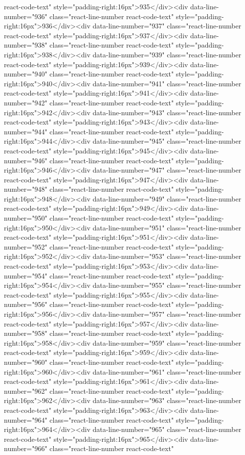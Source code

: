 react-code-text" style="padding-right:16px">935</div><div data-line-number="936" class="react-line-number react-code-text" style="padding-right:16px">936</div><div data-line-number="937" class="react-line-number react-code-text" style="padding-right:16px">937</div><div data-line-number="938" class="react-line-number react-code-text" style="padding-right:16px">938</div><div data-line-number="939" class="react-line-number react-code-text" style="padding-right:16px">939</div><div data-line-number="940" class="react-line-number react-code-text" style="padding-right:16px">940</div><div data-line-number="941" class="react-line-number react-code-text" style="padding-right:16px">941</div><div data-line-number="942" class="react-line-number react-code-text" style="padding-right:16px">942</div><div data-line-number="943" class="react-line-number react-code-text" style="padding-right:16px">943</div><div data-line-number="944" class="react-line-number react-code-text" style="padding-right:16px">944</div><div data-line-number="945" class="react-line-number react-code-text" style="padding-right:16px">945</div><div data-line-number="946" class="react-line-number react-code-text" style="padding-right:16px">946</div><div data-line-number="947" class="react-line-number react-code-text" style="padding-right:16px">947</div><div data-line-number="948" class="react-line-number react-code-text" style="padding-right:16px">948</div><div data-line-number="949" class="react-line-number react-code-text" style="padding-right:16px">949</div><div data-line-number="950" class="react-line-number react-code-text" style="padding-right:16px">950</div><div data-line-number="951" class="react-line-number react-code-text" style="padding-right:16px">951</div><div data-line-number="952" class="react-line-number react-code-text" style="padding-right:16px">952</div><div data-line-number="953" class="react-line-number react-code-text" style="padding-right:16px">953</div><div data-line-number="954" class="react-line-number react-code-text" style="padding-right:16px">954</div><div data-line-number="955" class="react-line-number react-code-text" style="padding-right:16px">955</div><div data-line-number="956" class="react-line-number react-code-text" style="padding-right:16px">956</div><div data-line-number="957" class="react-line-number react-code-text" style="padding-right:16px">957</div><div data-line-number="958" class="react-line-number react-code-text" style="padding-right:16px">958</div><div data-line-number="959" class="react-line-number react-code-text" style="padding-right:16px">959</div><div data-line-number="960" class="react-line-number react-code-text" style="padding-right:16px">960</div><div data-line-number="961" class="react-line-number react-code-text" style="padding-right:16px">961</div><div data-line-number="962" class="react-line-number react-code-text" style="padding-right:16px">962</div><div data-line-number="963" class="react-line-number react-code-text" style="padding-right:16px">963</div><div data-line-number="964" class="react-line-number react-code-text" style="padding-right:16px">964</div><div data-line-number="965" class="react-line-number react-code-text" style="padding-right:16px">965</div><div data-line-number="966" class="react-line-number react-code-text" 